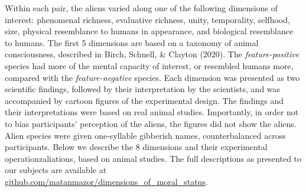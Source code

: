 \documentclass[10pt, letterpaper]{article}
\begin{document}
Within each pair, the aliens varied along one of the following
dimensions of interest: phenomenal richness, evaluative richness, unity,
temporality, selfhood, size, physical resemblance to humans in
appearance, and biological resemblance to humans. The first 5 dimensions
are based on a taxonomy of animal consciousness, described in Birch,
Schnell, \& Clayton (2020). The \emph{feature-positive} species had more
of the mental capacity of interest, or resembled humans more, compared
with the \emph{feature-negative} species. Each dimension was presented
as two scientific findings, followed by their interpretation by the
scientists, and was accompanied by cartoon figures of the experimental
design. The findings and their interpretations were based on real animal
studies. Importantly, in order not to bias participants' perception of
the aliens, the figures did not show the aliens. Alien species were
given one-syllable gibberish names, counterbalanced across participants.
Below we describe the 8 dimensions and their experimental
operationzaliations, based on animal studies. The full descriptions as
presented to our subjects are available at
\href{https://github.com/matanmazor/dimensions_of_moral_status}{github.com/matanmazor/dimensions\_of\_moral\_status}.
\end{document}
